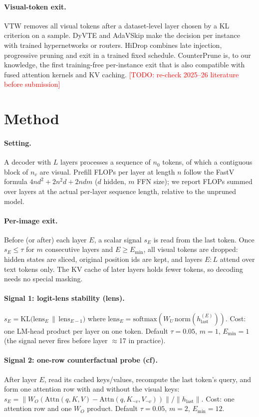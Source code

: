 \documentclass[10pt]{article}
\newcommand{\method}{CounterPrune}
\newcommand{\todo}[1]{\textcolor{red}{[TODO: #1]}}
\begin{document}
\paragraph{Visual-token exit.} VTW \citep{lin2024vtw} removes all visual tokens after a dataset-level layer chosen by a
KL criterion on a sample. DyVTE \citep{dyvte2024} and AdaVSkip \citep{adavskip2026} make the decision per instance with
trained hypernetworks or routers. HiDrop combines late injection, progressive pruning and exit in a trained fixed
schedule. \method{} is, to our knowledge, the first training-free per-instance exit that is also compatible with fused
attention kernels and KV caching. \todo{re-check 2025--26 literature before submission}

\section{Method}
\label{sec:method}
\paragraph{Setting.} A decoder with $L$ layers processes a sequence of $n_0$ tokens, of which a contiguous block of
$n_v$ are visual. Prefill FLOPs per layer at length $n$ follow the FastV formula $4nd^2 + 2n^2d + 2ndm$ ($d$ hidden,
$m$ FFN size); we report FLOPs summed over layers at the actual per-layer sequence length, relative to the unpruned
model.
\paragraph{Per-image exit.} Before (or after) each layer $E$, a scalar signal $s_E$ is read from the last token. Once
$s_E \le \tau$ for $m$ consecutive layers and $E \ge E_{\min}$, all visual tokens are dropped: hidden states are sliced,
original position ids are kept, and layers $E{:}L$ attend over text tokens only. The KV cache of later layers holds
fewer tokens, so decoding needs no special masking.
\paragraph{Signal 1: logit-lens stability (lens).} $s_E = \mathrm{KL}\big(\mathrm{lens}_E \,\|\, \mathrm{lens}_{E-1}\big)$
where $\mathrm{lens}_E = \mathrm{softmax}(W_U\,\mathrm{norm}(h^{(E)}_{\text{last}}))$. Cost: one LM-head product
per layer on one token. Default $\tau=0.05$, $m=1$, $E_{\min}=1$ (the signal never fires before layer $\approx$17 in
practice).
\paragraph{Signal 2: one-row counterfactual probe (cf).} After layer $E$, read its cached keys/values, recompute the
last token's query, and form one attention row with and without the visual keys:
$s_E = \|W_O(\mathrm{Attn}(q, K, V) - \mathrm{Attn}(q, K_{\neg v}, V_{\neg v}))\| / \|h_{\text{last}}\|$.
Cost: one attention row and one $W_O$ product. Default $\tau=0.05$, $m=2$, $E_{\min}=12$.
\end{document}
